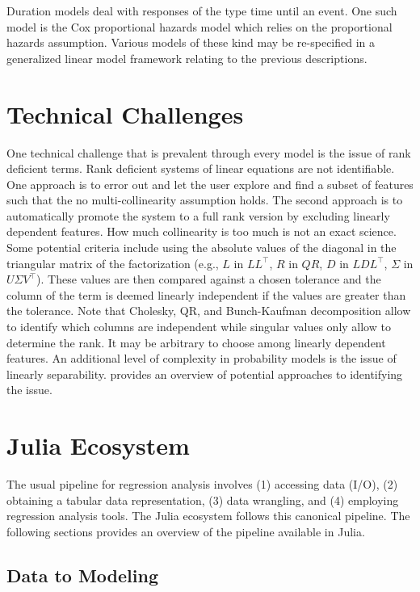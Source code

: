 \documentclass{juliacon}
\begin{document}
Duration models deal with responses of the type time until an event. One such model is the Cox proportional hazards model which relies on the proportional hazards assumption. Various models of these kind may be re-specified in a generalized linear model framework relating to the previous descriptions.

\section{Technical Challenges}

One technical challenge that is prevalent through every model is the issue of rank deficient terms. Rank deficient systems of linear equations are not identifiable. One approach is to error out and let the user explore and find a subset of features such that the no multi-collinearity assumption holds. The second approach is to automatically promote the system to a full rank version by excluding linearly dependent features. How much collinearity is too much is not an exact science. Some potential criteria include using the absolute values of the diagonal in the triangular matrix of the factorization (e.g., $L$ in $LL^{\top}$, $R$ in $QR$, $D$ in $LDL^{\top}$, $\Sigma$ in $U\Sigma V^{\top}$). These values are then compared against a chosen tolerance and the column of the term is deemed linearly independent if the values are greater than the tolerance. Note that Cholesky, QR, and Bunch-Kaufman decomposition allow to identify which columns are independent while singular values only allow to determine the rank. It may be arbitrary to choose among linearly dependent features. An additional level of complexity in probability models is the issue of linearly separability. \cite{Konis_2007} provides an overview of potential approaches to identifying the issue.

\section{Julia Ecosystem}

The usual pipeline for regression analysis involves (1) accessing data (I/O), (2) obtaining a tabular data representation, (3) data wrangling, and (4) employing regression analysis tools. The Julia ecosystem follows this canonical pipeline. The following sections provides an overview of the pipeline available in Julia.

\subsection{Data to Modeling}
\end{document}
